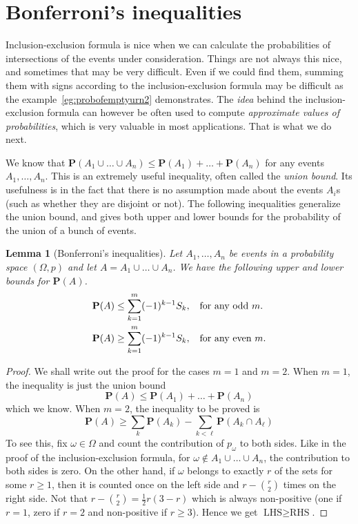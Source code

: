 \documentclass[preprint,  11pt]{amsart}
\theoremstyle{plain} %
\newtheorem{lemma}[theorem]{Lemma}
\theoremstyle{definition} %
\begin{document}
{{{{{{{{{{{{{%
\section{Bonferroni's inequalities}
Inclusion-exclusion formula is nice when we can calculate the probabilities of intersections of the events under consideration. Things are not always this nice, and sometimes that may be very difficult. Even if we could find them, summing them with signs according to the inclusion-exclusion formula may be difficult as the example~\ref{eg:probofemptyurn2} demonstrates. The {\em idea} behind the inclusion-exclusion formula can however be often used to compute {\em approximate values of probabilities}, which is very valuable in most applications. That is what we do next.


We know that $\mathbf{P}(A_{1}\cup \ldots \cup A_{n})\le \mathbf{P}(A_{1})+\ldots +\mathbf{P}(A_{n})$ for any events $A_{1},\ldots ,A_{n}$. This is an extremely useful inequality, often called the {\em union bound}. Its usefulness is in the fact that there is no assumption made about the events $A_{i}$s (such as whether they are disjoint or not). The following inequalities generalize the union bound, and gives both upper and lower bounds for the probability of the union of a bunch of events.

\begin{lemma}[Bonferroni's inequalities]\label{lem:Bonferroni's inequalities} Let $A_{1},\ldots, A_{n}$ be events in a probability space $(\Omega,p)$ and let $A=A_{1}\cup \ldots \cup A_{n}$. We have the following upper and lower bounds for  $\mathbf{P}(A)$.
\begin{align*}
\mathbf{P}(A) &\le \sum_{k=1}^{m}(-1)^{k-1}S_{k}, \hspace{2mm} \mbox{ for any odd }m. \\
\mathbf{P}(A) &\ge \sum_{k=1}^{m}(-1)^{k-1}S_{k}, \hspace{2mm} \mbox{ for any even }m.
\end{align*}
\end{lemma}
\begin{proof} We shall write out the proof for the cases $m=1$ and $m=2$. When $m=1$, the inequality is just the union bound
$$
 \mathbf{P}(A)\le \mathbf{P}(A_{1})+\ldots +\mathbf{P}(A_{n})
$$
which we know. When $m=2$, the inequality to be proved is
$$
\mathbf{P}(A)\ge \sum_{k}\mathbf{P}(A_{k})-\sum_{k<\ell}\mathbf{P}(A_{k}\cap A_{\ell})
$$
To see this, fix $\omega\in \Omega$ and count the contribution of $p_{\omega}$ to both sides. Like in the proof of the inclusion-exclusion formula, for $\omega \not\in A_{1}\cup\ldots \cup A_{n}$, the contribution to both sides is zero. On the other hand, if $\omega$ belongs to exactly $r$ of the sets for some $r\ge 1$, then it is counted once on the left side and $r-\binom{r}{2}$ times on the right side. Not that $r-\binom{r}{2} = \frac{1}{2}r(3-r)$ which is always non-positive (one if $r=1$, zero if $r=2$ and non-positive if $r\ge 3$). Hence we get $\mbox{LHS}\ge \mbox{RHS}$.


\end{proof}}}}}}}}}}}}}}
\end{document}
